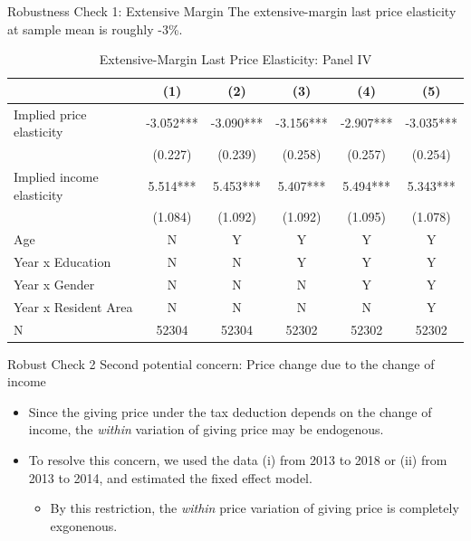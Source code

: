 \documentclass[
  ignorenonframetext,
]{beamer}
\providecommand{\tightlist}{%
  \setlength{\itemsep}{0pt}\setlength{\parskip}{0pt}}
\begin{document}
\begin{frame}{Robustness Check 1: Extensive Margin}
\protect\hypertarget{robustness-check-1-extensive-margin}{}
The extensive-margin last price elasticity at sample mean is roughly -3\%.

\begin{table}

\caption{\label{tab:kableLastElasticity2Slide2}Extensive-Margin Last Price Elasticity: Panel IV}
\centering
\fontsize{7}{9}\selectfont
\begin{tabular}[t]{lccccc}
\toprule
 & (1) & (2) & (3) & (4) & (5)\\
\midrule
Implied price elasticity & -3.052*** & -3.090*** & -3.156*** & -2.907*** & -3.035***\\
 & (0.227) & (0.239) & (0.258) & (0.257) & (0.254)\\
Implied income elasticity & 5.514*** & 5.453*** & 5.407*** & 5.494*** & 5.343***\\
 & (1.084) & (1.092) & (1.092) & (1.095) & (1.078)\\
Age & N & Y & Y & Y & Y\\
Year x Education & N & N & Y & Y & Y\\
Year x Gender & N & N & N & Y & Y\\
Year x Resident Area & N & N & N & N & Y\\
N & 52304 & 52304 & 52302 & 52302 & 52302\\
\bottomrule
\end{tabular}
\end{table}
\end{frame}

\begin{frame}{Robust Check 2}
\protect\hypertarget{robust-check-2}{}
Second potential concern: Price change due to the change of income

\begin{itemize}
\tightlist
\item
  Since the giving price under the tax deduction depends on the change of income, the \emph{within} variation of giving price may be endogenous.
\item
  To resolve this concern, we used the data (i) from 2013 to 2018 or (ii) from 2013 to 2014, and estimated the fixed effect model.

  \begin{itemize}
  \tightlist
  \item
    By this restriction, the \emph{within} price variation of giving price is completely exgonenous.
  \end{itemize}
\end{itemize}
\end{frame}
\end{document}
